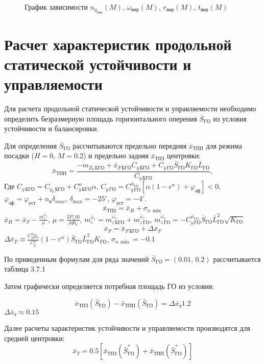 \begin{figure}[H]
\centering
\resizebox{.79\linewidth}{!}{}
\caption{График зависимости $n_{y_{вир}}(M)$, $\omega_{вир}(M)$, $r_{вир}(M)$, $t_{вир}(M)$}
\label{fig:turn}
\end{figure}


\section{Расчет характеристик продольной статической устойчивости и
управляемости}

Для расчета продольной статической устойчивости и управляемости
необходимо определить безразмерную площадь горизонтального оперения
$\bar{S}_{ГО}$ из условия устойчивости и
балансировки.

Для определения $\bar{S}_{ГО}$ рассчитываются
предельно передняя $\bar{x}_{ТПП}$ для режима
посадки ($H=0,\, M=0.2$) и предельно задняя
$\bar{x}_{ТПЗ}$ центровки:
\[
    \bar{x}_{ТПП} = \frac{-m_{Z_0\, БГО} + \bar{x}_{F\, БГО}C_{y\, БГО}+ 
    C_{y\, ГО} \bar{S}_{ГО} K_{ГО} \bar{L}_{ГО}}{C_{y\, БГО}},
\]
Где $C_{y \, БГО} = C_{y_0\,{БГО}} + C_{y\, БГО}^\alpha \alpha$, 
$C_{y\, ГО} = C_{y\, ГО}^{\alpha_{ГО}} \left[ \alpha(1-\epsilon^\alpha) + 
\varphi_{эф}\right] < 0$, $\varphi_{эф} = \varphi_{уст} + n_в \delta_{max}$,
$\delta_{\max} = -25^\circ$, $\varphi_{уст} = -4^\circ$. 
\[
    \bar{x}_{ТПЗ} = \bar{x}_{H} + \sigma_{n\, \min}
\]
$\bar{x}_{H} = \bar{x}_F - \frac{m_z^{\bar{\omega}_z}}{\mu}$, $\mu = \frac{2 P_s 10 }{\rho g b_a}$,
$m_z^{\bar{\omega}_z} = m_{z\, БГО}^{\bar{\omega}_z}+m_{z\, ГО}^{\bar{\omega}_z}$,
$m_{z\, ГО}^{\bar{\omega}_z} = - C_{y\, {ГО}}^{\alpha_{ГО}} \bar{S}_{ГО} \bar{L}_{ГО}^2
\sqrt{K_{ГО}}$
\[
    \bar{x}_F = \bar{x}_{F\, БГО} + \Delta \bar{x}_F
\]
$ \Delta \bar{x}_F \approx \frac{C_{y\, ГО}^{\alpha_{ГО}} }{C_{y}^\alpha}
(1-\varepsilon^\alpha)\bar{S}_{ГО} \bar{L}_{ГО}^2
K_{ГО}$, $\sigma_{n\, \min} = -0.1$

По приведенным формулам для ряда значений
$\bar{S}_{ГО} = (0.01,\, 0.2)$ рассчитывается таблица
3.7.1

Затем графически определяется потребная площадь ГО из условия:

\[
    \bar{x}_{ТПЗ}(\bar{S}_{ГО}) - \bar{x}_{ТПП}(\bar{S}_{ГО}) = \Delta \bar{x}_{э} 1.2 
\]
$\Delta \bar{x}_{э} \approx 0.15$


Далее расчеты характеристик устойчивости и управляемости производятся
для средней центровки: 
\[
    \bar{x}_{T} = 0.5 \left[  \bar{x}_{ТПЗ}(\bar{S}_{ГО}^*) + \bar{x}_{ТПП}(\bar{S}_{ГО}^*) \right] 
\]

